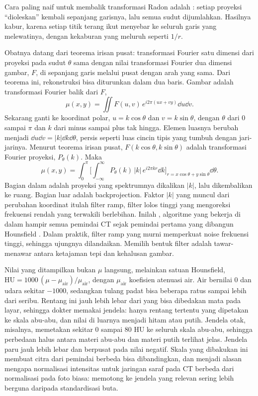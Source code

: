 Cara paling naif untuk membalik transformasi Radon adalah : setiap proyeksi ``dioleskan''
kembali sepanjang garisnya, lalu semua sudut dijumlahkan. Hasilnya kabur, karena setiap titik terang ikut menyebar
ke seluruh garis yang melewatinya, dengan kekaburan yang meluruh seperti $1/r$.

Obatnya datang dari teorema irisan pusat: transformasi Fourier satu dimensi dari proyeksi pada sudut $\theta$ sama
dengan nilai transformasi Fourier dua dimensi gambar, $F$, di sepanjang garis melalui pusat dengan arah yang sama. Dari
teorema ini, rekonstruksi bisa diturunkan dalam dua baris. Gambar adalah transformasi Fourier balik dari $F$,
\begin{equation}
\mu(x,y)=\iint F(u,v)\,e^{i2\pi(ux+vy)}\dd u\dd v .
\end{equation}
Sekarang ganti ke koordinat polar, $u=k\cos\theta$ dan $v=k\sin\theta$, dengan $\theta$ dari 0 sampai $\pi$ dan $k$ dari
minus sampai plus tak hingga. Elemen luasnya berubah menjadi $\dd u\dd v=|k|\dd k\dd\theta$, persis seperti luas cincin
tipis yang tumbuh dengan jari-jarinya. Menurut teorema irisan pusat, $F(k\cos\theta,k\sin\theta)$ adalah transformasi
Fourier proyeksi, $P_\theta(k)$. Maka
\begin{equation}
\mu(x,y)=\int_0^\pi\Big[\int_{-\infty}^{\infty}P_\theta(k)\,|k|\,e^{i2\pi kr}\dd k\Big]_{r=x\cos\theta+y\sin\theta}\dd\theta .
\end{equation}
Bagian dalam adalah proyeksi yang spektrumnya dikalikan $|k|$, lalu dikembalikan ke ruang. Bagian luar adalah
backprojection. Faktor $|k|$ yang muncul dari perubahan koordinat itulah filter ramp, filter lolos tinggi yang mengoreksi
frekuensi rendah yang terwakili berlebihan. Inilah  \citep{kak1988}, algoritme yang bekerja
di dalam hampir semua pemindai CT sejak pemindai pertama yang dibangun Hounsfield \citep{hounsfield1973}. Dalam praktik,
filter ramp yang murni memperkuat noise frekuensi tinggi, sehingga ujungnya dilandaikan. Memilih bentuk filter adalah
tawar-menawar antara ketajaman tepi dan kehalusan gambar.

Nilai yang ditampilkan bukan $\mu$ langsung, melainkan satuan Hounsfield,
$\mathrm{HU}=1000\,(\mu-\mu_{\mathrm{air}})/\mu_{\mathrm{air}}$, dengan $\mu_{\mathrm{air}}$ koefisien atenuasi air. Air
bernilai 0 dan udara sekitar $-1000$, sedangkan tulang padat bisa beberapa ratus sampai lebih dari seribu. Rentang ini jauh
lebih lebar dari yang bisa dibedakan mata pada layar, sehingga dokter memakai jendela: hanya rentang tertentu yang dipetakan
ke skala abu-abu, dan nilai di luarnya menjadi hitam atau putih. Jendela otak, misalnya, memetakan sekitar 0 sampai 80 HU
ke seluruh skala abu-abu, sehingga perbedaan halus antara materi abu-abu dan materi putih terlihat jelas. Jendela paru
jauh lebih lebar dan berpusat pada nilai negatif. Skala yang dibakukan ini membuat citra dari pemindai berbeda bisa
dibandingkan, dan menjadi alasan mengapa normalisasi intensitas untuk jaringan saraf pada CT berbeda dari normalisasi pada
foto biasa: memotong ke jendela yang relevan sering lebih berguna daripada standardisasi buta.

